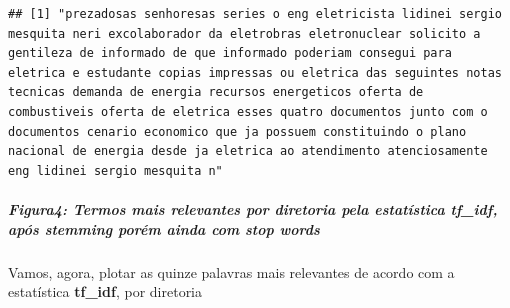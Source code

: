 \documentclass[]{article}
\newenvironment{Shaded}{\begin{snugshade}}{\end{snugshade}}
\newcommand{\DecValTok}[1]{\textcolor[rgb]{0.00,0.00,0.81}{#1}}
\newcommand{\OperatorTok}[1]{\textcolor[rgb]{0.81,0.36,0.00}{\textbf{#1}}}
\newcommand{\NormalTok}[1]{#1}
\let\oldsubparagraph\subparagraph
\renewcommand{\subparagraph}[1]{\oldsubparagraph{#1}\mbox{}}
\begin{document}
\begin{Shaded}
\end{Shaded}

\begin{verbatim}
## [1] "prezadosas senhoresas series o eng eletricista lidinei sergio mesquita neri excolaborador da eletrobras eletronuclear solicito a gentileza de informado de que informado poderiam consegui para eletrica e estudante copias impressas ou eletrica das seguintes notas tecnicas demanda de energia recursos energeticos oferta de combustiveis oferta de eletrica esses quatro documentos junto com o documentos cenario economico que ja possuem constituindo o plano nacional de energia desde ja eletrica ao atendimento atenciosamente eng lidinei sergio mesquita n"
\end{verbatim}

\subparagraph{\texorpdfstring{Figura4: Termos mais relevantes por
diretoria pela estatística \textbf{tf\_idf}, após \textbf{stemming}
porém ainda com \textbf{stop
words}}{Figura4: Termos mais relevantes por diretoria pela estatística tf\_idf, após stemming porém ainda com stop words}}\label{figura4-termos-mais-relevantes-por-diretoria-pela-estatistica-tf_idf-apos-stemming-porem-ainda-com-stop-words}

Vamos, agora, plotar as quinze palavras mais relevantes de acordo com a
estatística \textbf{tf\_idf}, por diretoria
\end{document}
